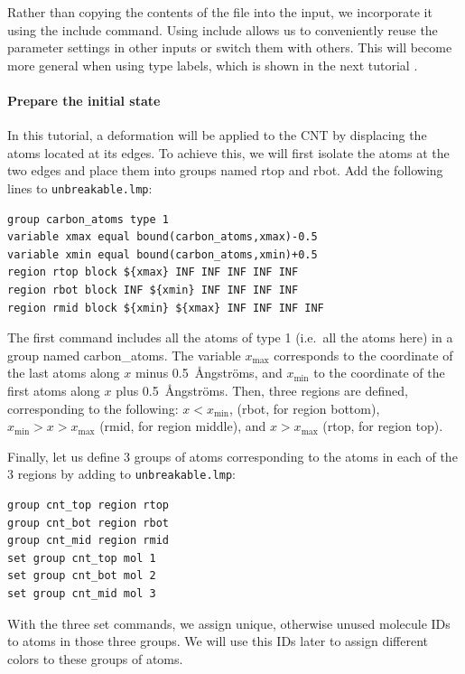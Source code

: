 \documentclass[9pt,tutorial]{livecoms}
\newcommand{\lmpcmd}[1]{\hspace{0pt}\colorbox{listing}{\textcolor{command}{\small{#1}}}\hspace{0pt}} %
\newcommand{\flecmd}[1]{\textcolor{command}{\texttt{#1}}} %
\begin{document}
Rather than copying the contents of the file into the input, we
incorporate it using the \lmpcmd{include} command.  Using \lmpcmd{include} allows
us to conveniently reuse the parameter settings
in other inputs or switch them with others.  This will become more general
when using type labels, which is shown in the next
tutorial \cite{typelabel_paper}.

\paragraph{Prepare the initial state}

In this tutorial, a deformation will be applied to the CNT by displacing
the atoms located at its edges.  To achieve this, we will first isolate the
atoms at the two edges and place them into groups named \lmpcmd{rtop} and
\lmpcmd{rbot}.  Add the following lines to \flecmd{unbreakable.lmp}:
\begin{lstlisting}
group carbon_atoms type 1
variable xmax equal bound(carbon_atoms,xmax)-0.5
variable xmin equal bound(carbon_atoms,xmin)+0.5
region rtop block ${xmax} INF INF INF INF INF
region rbot block INF ${xmin} INF INF INF INF
region rmid block ${xmin} ${xmax} INF INF INF INF
\end{lstlisting}
The first command includes all the atoms of type 1 (i.e.~all the atoms here)
in a group named \lmpcmd{carbon\_atoms}.
The variable $x_\text{max}$ corresponds to the coordinate of the
last atoms along $x$ minus 0.5~Ångströms, and $x_\text{min}$ to the coordinate
of the first atoms along $x$ plus 0.5~Ångströms.  Then, three regions are defined,
corresponding to the following: $x < x_\text{min}$, (\lmpcmd{rbot}, for region
bottom), $x_\text{min} > x > x_\text{max}$ (\lmpcmd{rmid}, for region middle),
and $x > x_\text{max}$ (\lmpcmd{rtop}, for region top).

Finally, let us define 3 groups of atoms corresponding to the atoms
in each of the 3 regions by adding to \flecmd{unbreakable.lmp}:
\begin{lstlisting}
group cnt_top region rtop
group cnt_bot region rbot
group cnt_mid region rmid
set group cnt_top mol 1
set group cnt_bot mol 2
set group cnt_mid mol 3
\end{lstlisting}
With the three \lmpcmd{set} commands, we assign unique, otherwise unused
molecule IDs to atoms in those three groups.  We will use this IDs later to
assign different colors to these groups of atoms.
\end{document}
